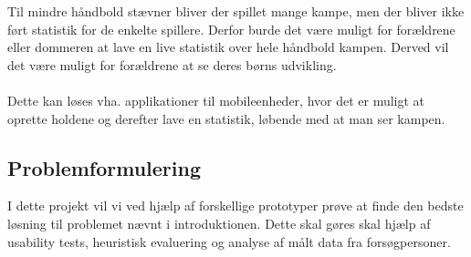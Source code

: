 Til mindre håndbold stævner bliver der spillet mange kampe, men der bliver ikke ført statistik for de enkelte spillere. Derfor burde det være muligt for forældrene eller dommeren at lave en live statistik over hele håndbold kampen. Derved vil det være muligt for forældrene at se deres børns udvikling.\\\\
Dette kan løses vha. applikationer til mobileenheder, hvor det er muligt at oprette holdene og derefter lave en statistik, løbende med at man ser kampen. 

\subsection*{Problemformulering}
I dette projekt vil vi ved hjælp af forskellige prototyper prøve at finde den bedste løsning til problemet nævnt i introduktionen. Dette skal gøres skal hjælp af usability tests, heuristisk evaluering og analyse af målt data fra forsøgpersoner.

